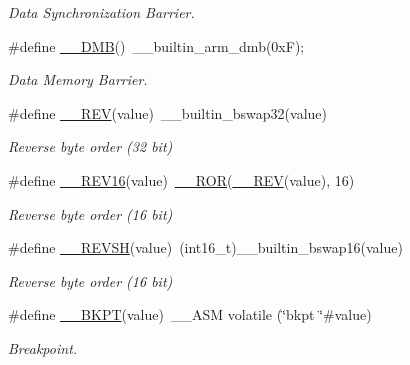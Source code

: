 \begin{DoxyCompactItemize}
\begin{DoxyCompactList}\small\item\em Data Synchronization Barrier. \end{DoxyCompactList}\item 
\#define \hyperlink{group___c_m_s_i_s___core___instruction_interface_ga671101179b5943990785f36f8c1e2269}{\+\_\+\+\_\+\+D\+MB}()~\+\_\+\+\_\+builtin\+\_\+arm\+\_\+dmb(0x\+F);
\begin{DoxyCompactList}\small\item\em Data Memory Barrier. \end{DoxyCompactList}\item 
\#define \hyperlink{group___c_m_s_i_s___core___instruction_interface_gaca25a02e09983da5558f5242f2f635bc}{\+\_\+\+\_\+\+R\+EV}(value)~\+\_\+\+\_\+builtin\+\_\+bswap32(value)
\begin{DoxyCompactList}\small\item\em Reverse byte order (32 bit) \end{DoxyCompactList}\item 
\#define \hyperlink{group___c_m_s_i_s___core___instruction_interface_gad35497777af37e7809271b5e6f9510ba}{\+\_\+\+\_\+\+R\+E\+V16}(value)~\hyperlink{group___c_m_s_i_s___core___instruction_interface_gab16acb6456176f1e87a4f2724c2b6028}{\+\_\+\+\_\+\+R\+OR}(\hyperlink{group___c_m_s_i_s___core___instruction_interface_gadb92679719950635fba8b1b954072695}{\+\_\+\+\_\+\+R\+EV}(value), 16)
\begin{DoxyCompactList}\small\item\em Reverse byte order (16 bit) \end{DoxyCompactList}\item 
\#define \hyperlink{group___c_m_s_i_s___core___instruction_interface_gae580812686119c9c5cf3c11a7519a404}{\+\_\+\+\_\+\+R\+E\+V\+SH}(value)~(int16\+\_\+t)\+\_\+\+\_\+builtin\+\_\+bswap16(value)
\begin{DoxyCompactList}\small\item\em Reverse byte order (16 bit) \end{DoxyCompactList}\item 
\#define \hyperlink{group___c_m_s_i_s___core___instruction_interface_ga15ea6bd3c507d3e81c3b3a1258e46397}{\+\_\+\+\_\+\+B\+K\+PT}(value)~\+\_\+\+\_\+\+A\+SM volatile (\char`\"{}bkpt \char`\"{}\#value)
\begin{DoxyCompactList}\small\item\em Breakpoint. \end{DoxyCompactList}\item 

\end{DoxyCompactItemize}
